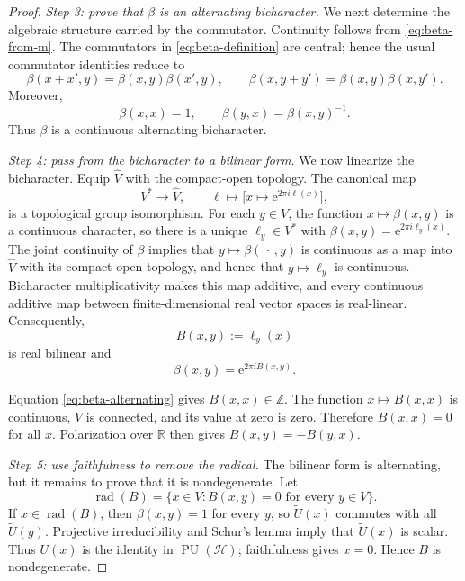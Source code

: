 \documentclass[10pt,a4paper]{amsart}
\numberwithin{equation}{section}
\newcommand{\cH}{\mathcal H}
\newcommand{\R}{\mathbb R}
\newcommand{\PU}{\operatorname{PU}}
\newcommand{\e}{\mathrm e}
\newcommand{\Step}[1]{\par\medskip\noindent\textit{#1.}\quad}
\begin{document}
\begin{proof}
\Step{Step 3: prove that $\beta$ is an alternating bicharacter}
We next determine the algebraic structure carried by the commutator.
Continuity follows from \eqref{eq:beta-from-m}.  The commutators in
\eqref{eq:beta-definition} are central; hence the usual commutator identities
reduce to
\[
 \beta(x+x',y)=\beta(x,y)\beta(x',y),
 \qquad
 \beta(x,y+y')=\beta(x,y)\beta(x,y').
\]
Moreover,
\begin{equation}\label{eq:beta-alternating}
 \beta(x,x)=1,
 \qquad \beta(y,x)=\beta(x,y)^{-1}.
\end{equation}
Thus $\beta$ is a continuous alternating bicharacter.

\Step{Step 4: pass from the bicharacter to a bilinear form}
We now linearize the bicharacter.  Equip $\widehat V$ with the compact-open
topology.  The canonical map
\[
 V^*\longrightarrow\widehat V,
 \qquad
 \ell\longmapsto\bigl[x\mapsto\e^{2\pi i\ell(x)}\bigr],
\]
is a topological group isomorphism.  For each $y\in V$, the function
$x\mapsto\beta(x,y)$ is a continuous character, so there is a unique
$\ell_y\in V^*$ with $\beta(x,y)=\e^{2\pi i\ell_y(x)}$.  The joint
continuity of $\beta$ implies that $y\mapsto\beta(\,\cdot\,,y)$ is
continuous as a map into $\widehat V$ with its compact-open topology, and
hence that $y\mapsto\ell_y$ is continuous.  Bicharacter
multiplicativity makes this map additive, and every continuous additive map
between finite-dimensional real vector spaces is real-linear.  Consequently,
\begin{equation}\label{eq:B-definition}
 B(x,y):=\ell_y(x)
\end{equation}
is real bilinear and
\begin{equation}\label{eq:beta-B}
 \beta(x,y)=\e^{2\pi iB(x,y)}.
\end{equation}

Equation \eqref{eq:beta-alternating} gives $B(x,x)\in\mathbb Z$.  The
function $x\mapsto B(x,x)$ is continuous, $V$ is connected, and its value at
zero is zero.  Therefore $B(x,x)=0$ for all $x$.  Polarization over $\R$
then gives $B(x,y)=-B(y,x)$.

\Step{Step 5: use faithfulness to remove the radical}
The bilinear form is alternating, but it remains to prove that it is
nondegenerate.  Let
\[
 \operatorname{rad}(B)
 =\{x\in V:B(x,y)=0\text{ for every }y\in V\}.
\]
If $x\in\operatorname{rad}(B)$, then $\beta(x,y)=1$ for every $y$, so
$\widetilde U(x)$ commutes with all $\widetilde U(y)$.  Projective
irreducibility and Schur's lemma imply that $\widetilde U(x)$ is scalar.
Thus $U(x)$ is the identity in $\PU(\cH)$; faithfulness gives $x=0$.
Hence $B$ is nondegenerate.


\end{proof}
\end{document}
